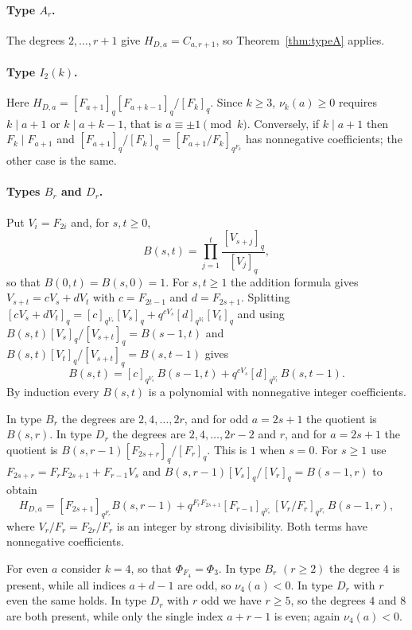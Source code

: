 \documentclass[11pt,a4paper]{article}
\theoremstyle{definition}\newtheorem{definition}[theorem]{Definition}
\theoremstyle{remark}\newtheorem{remark}[theorem]{Remark}\newtheorem{example}[theorem]{Example}
\numberwithin{equation}{section}
\begin{document}
\paragraph{Type $A_r$.} The degrees $2,\ldots,r+1$ give $H_{D,a}=C_{a,r+1}$, so Theorem~\ref{thm:typeA} applies.

\paragraph{Type $I_2(k)$.} Here $H_{D,a}=[F_{a+1}]_q[F_{a+k-1}]_q/[F_k]_q$. Since $k\ge3$, $\nu_k(a)\ge0$ requires $k\mid a+1$ or $k\mid a+k-1$, that is $a\equiv\pm1\pmod k$. Conversely, if $k\mid a+1$ then $F_k\mid F_{a+1}$ and $[F_{a+1}]_q/[F_k]_q=[F_{a+1}/F_k]_{q^{F_k}}$ has nonnegative coefficients; the other case is the same.

\paragraph{Types $B_r$ and $D_r$.} Put $V_i=F_{2i}$ and, for $s,t\ge0$,
\[
 B(s,t)=\prod_{j=1}^{t}\frac{[V_{s+j}]_q}{[V_j]_q},
\]
so that $B(0,t)=B(s,0)=1$. For $s,t\ge1$ the addition formula gives $V_{s+t}=cV_s+dV_t$ with $c=F_{2t-1}$ and $d=F_{2s+1}$. Splitting $[cV_s+dV_t]_q=[c]_{q^{V_s}}[V_s]_q+q^{cV_s}[d]_{q^{V_t}}[V_t]_q$ and using $B(s,t)[V_s]_q/[V_{s+t}]_q=B(s-1,t)$ and $B(s,t)[V_t]_q/[V_{s+t}]_q=B(s,t-1)$ gives
\[
 B(s,t)=[c]_{q^{V_s}}\,B(s-1,t)+q^{cV_s}[d]_{q^{V_t}}\,B(s,t-1).
\]
By induction every $B(s,t)$ is a polynomial with nonnegative integer coefficients.

In type $B_r$ the degrees are $2,4,\ldots,2r$, and for odd $a=2s+1$ the quotient is $B(s,r)$. In type $D_r$ the degrees are $2,4,\ldots,2r-2$ and $r$, and for $a=2s+1$ the quotient is $B(s,r-1)[F_{2s+r}]_q/[F_r]_q$. This is $1$ when $s=0$. For $s\ge1$ use $F_{2s+r}=F_rF_{2s+1}+F_{r-1}V_s$ and $B(s,r-1)[V_s]_q/[V_r]_q=B(s-1,r)$ to obtain
\[
 H_{D,a}=[F_{2s+1}]_{q^{F_r}}B(s,r-1)+q^{F_rF_{2s+1}}[F_{r-1}]_{q^{V_s}}\,[V_r/F_r]_{q^{F_r}}\,B(s-1,r),
\]
where $V_r/F_r=F_{2r}/F_r$ is an integer by strong divisibility. Both terms have nonnegative coefficients.

For even $a$ consider $k=4$, so that $\Phi_{F_4}=\Phi_3$. In type $B_r$ $(r\ge2)$ the degree $4$ is present, while all indices $a+d-1$ are odd, so $\nu_4(a)<0$. In type $D_r$ with $r$ even the same holds. In type $D_r$ with $r$ odd we have $r\ge5$, so the degrees $4$ and $8$ are both present, while only the single index $a+r-1$ is even; again $\nu_4(a)<0$.
\end{document}

